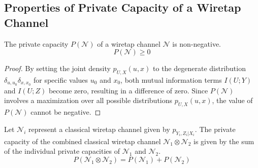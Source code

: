 \subsection{Properties of Private Capacity of a Wiretap Channel}

\begin{theorem}
The private capacity $P(\mathcal{N})$ of a wiretap channel $\mathcal{N}$ is non-negative.
$$P(\mathcal{N}) \geq 0$$
\end{theorem}

\begin{proof}
By setting the joint density $p_{U,X}(u, x)$ to the degenerate distribution $\delta_{u,u_0} \delta_{x,x_0}$ for specific values $u_0$ and $x_0$, both mutual information terms $I(U; Y)$ and $I(U; Z)$ become zero, resulting in a difference of zero. Since $P(\mathcal{N})$ involves a maximization over all possible distributions $p_{U,X}(u, x)$, the value of $P(\mathcal{N})$ cannot be negative.
\end{proof}

\begin{theorem}[Additivity]
Let $\mathcal{N}_i$ represent a classical wiretap channel given by $p_{Y_i, Z_i | X_i}$. The private capacity of the combined classical wiretap channel $\mathcal{N}_1 \otimes \mathcal{N}_2$ is given by the sum of the individual private capacities of $\mathcal{N}_1$ and $\mathcal{N}_2$.
$$P(\mathcal{N}_1 \otimes \mathcal{N}_2) = P(\mathcal{N}_1) + P(\mathcal{N}_2)$$
\end{theorem}

